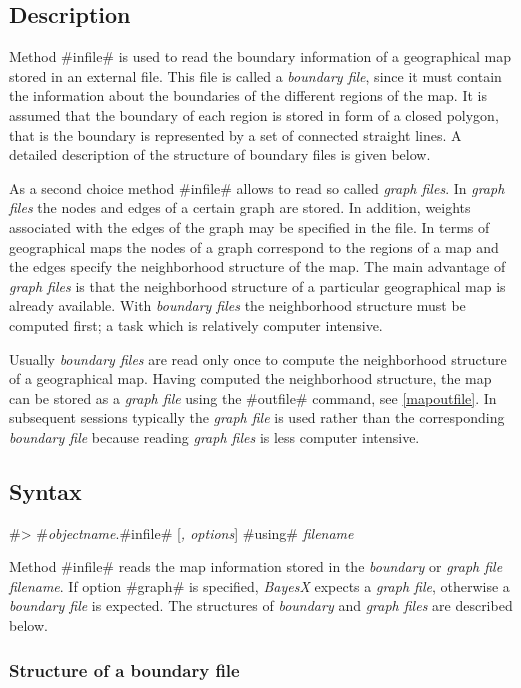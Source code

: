 \subsection{Description}


Method #infile# is used to read the boundary information of a
geographical map stored in an external file. This file is called a
{\em boundary file}, since it must contain the information about
the boundaries of the different regions of the map. It is assumed
that the boundary of each region is stored in form of a closed
polygon, that is the boundary is represented by a set of connected
straight lines. A detailed description of the structure of
boundary files is given below.

As a second choice method #infile# allows to read  so called {\em
graph files}. In {\em graph files} the nodes and edges of a
certain graph are stored. In addition, weights associated with the
edges of the graph may be specified in the file. In terms of
geographical maps the nodes of a graph correspond to the regions
of a map and the edges specify the neighborhood structure of the
map. The main advantage of {\em graph files} is that the
neighborhood structure of a particular geographical map is already
available. With {\em boundary files} the neighborhood structure
must be computed first; a task which is relatively computer
intensive.

Usually {\em boundary files} are read  only once to compute the
neighborhood structure of a geographical map. Having computed the
neighborhood structure, the map can be stored as a {\em graph
file} using the #outfile# command, see \autoref{mapoutfile}. In
subsequent sessions typically the {\em graph file} is used rather
than the corresponding {\em boundary file} because reading {\em
graph files} is less computer intensive.


\subsection{Syntax}

#> #{\em objectname}.#infile# [{\em , options}] #using# {\em filename}

Method #infile# reads the map information stored in the {\em
boundary} or {\em graph file} {\em filename}. If option #graph# is
specified, {\em BayesX} expects a {\em graph file}, otherwise a
{\em boundary file}
is expected. The structures of {\em boundary} and {\em graph files} are described below.

\subsubsection*{Structure of a boundary file}

